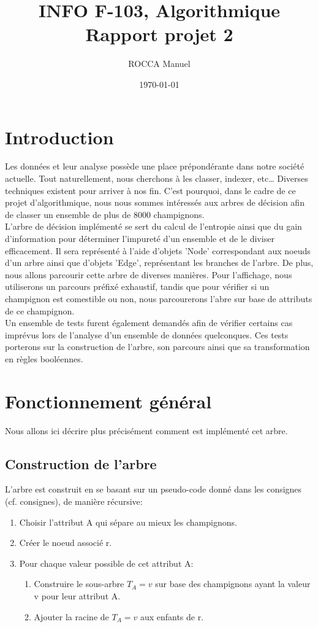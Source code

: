 \documentclass[utf8]{article}
\title{INFO F-103, Algorithmique\\Rapport projet 2}
\author{ROCCA Manuel}
\date{\today}
\begin{document}
\maketitle
\tableofcontents
\newpage


\section{Introduction}

Les données et leur analyse possède une place prépondérante dans notre société actuelle. Tout naturellement, nous cherchons à les classer, indexer, etc\dots
Diverses techniques existent pour arriver à nos fin. C'est pourquoi, dans le cadre de ce projet d'algorithmique, nous nous sommes intéressés aux arbres de 
décision afin de classer un ensemble de plus de 8000 champignons.\\
L'arbre de décision implémenté se sert du calcul de l'entropie ainsi que du gain d'information pour déterminer l'impureté d'un ensemble et de le diviser efficacement.
Il sera représenté à l'aide d'objets 'Node' correspondant aux noeuds d'un arbre ainsi que d'objets 'Edge', représentant les branches de l'arbre.
De plus, nous allons parcourir cette arbre de diverses manières. Pour l'affichage, nous utiliserons un parcours préfixé exhaustif, tandis que pour vérifier si un 
champignon est comestible ou non, nous parcourerons l'abre sur base de attributs de ce champignon.\\
Un ensemble de tests furent également demandés afin de vérifier certains cas imprévus lors de l'analyse d'un ensemble de données quelconques. Ces tests porterons sur la construction 
de l'arbre, son parcours ainsi que sa transformation en règles booléennes.\\


\section{Fonctionnement général}
Nous allons ici décrire plus précisément comment est implémenté cet arbre. 

\subsection{Construction de l'arbre}
\label{sec:buildtree}
L'arbre est construit en se basant sur un pseudo-code donné dans les consignes (cf. consignes), de manière récursive:
\begin{enumerate}
    \item Choisir l'attribut A qui sépare au mieux les champignons.
    \item Créer le noeud associé r.
    \item Pour chaque valeur possible de cet attribut A:
        \begin{enumerate}
            \item Construire le sous-arbre $T_A=v$ sur base des champignons ayant la valeur v pour leur attribut A.
            \item Ajouter la racine de $T_A=v$ aux enfants de r.
        \end{enumerate}
\end{enumerate}
\end{document}
